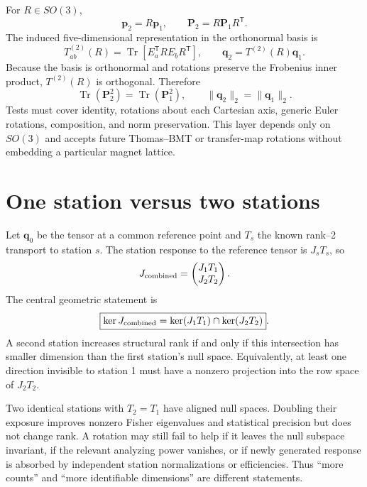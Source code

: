 \documentclass[11pt,a4paper]{article}
\newcommand{\Tens}{\bm P}
\newcommand{\vect}[1]{\bm{#1}}
\newcommand{\Tr}{\operatorname{Tr}}
\begin{document}
For $R\in SO(3)$,
\begin{equation}
 \vect p_2=R\vect p_1,
 \qquad
 \Tens_2=R\Tens_1R^{\mathsf T}.
 \label{eq:rotation}
\end{equation}
The induced five-dimensional representation in the orthonormal basis is
\begin{equation}
 T^{(2)}_{ab}(R)=\Tr\!\left[E_a^{\mathsf T}RE_bR^{\mathsf T}\right],
 \qquad
 \vect q_2=T^{(2)}(R)\vect q_1.
 \label{eq:rank2-map}
\end{equation}
Because the basis is orthonormal and rotations preserve the Frobenius inner
product, $T^{(2)}(R)$ is orthogonal.  Therefore
\begin{equation}
 \Tr(\Tens_2^2)=\Tr(\Tens_1^2),
 \qquad
 \lVert\vect q_2\rVert_2=\lVert\vect q_1\rVert_2.
\end{equation}
Tests must cover identity, rotations about each Cartesian axis, generic Euler
rotations, composition, and norm preservation.  This layer depends only on
$SO(3)$ and accepts future Thomas--BMT or transfer-map rotations without
embedding a particular magnet lattice.

\section{One station versus two stations}

Let $\vect q_0$ be the tensor at a common reference point and $T_s$ the known
rank--2 transport to station $s$.  The station response to the reference tensor
is $J_sT_s$, so
\begin{equation}
 J_{\rm combined}=
 \begin{pmatrix}
 J_1T_1\\J_2T_2
 \end{pmatrix}.
 \label{eq:combined-response}
\end{equation}
The central geometric statement is
\begin{equation}
 \boxed{
 \ker J_{\rm combined}
 =\ker(J_1T_1)\cap\ker(J_2T_2)}.
 \label{eq:kernel-intersection}
\end{equation}
A second station increases structural rank if and only if this intersection has
smaller dimension than the first station's null space.  Equivalently, at least
one direction invisible to station 1 must have a nonzero projection into the
row space of $J_2T_2$.

Two identical stations with $T_2=T_1$ have aligned null spaces.  Doubling their
exposure improves nonzero Fisher eigenvalues and statistical precision but does
not change rank.  A rotation may still fail to help if it leaves the null
subspace invariant, if the relevant analyzing power vanishes, or if newly
generated response is absorbed by independent station normalizations or
efficiencies.  Thus ``more counts'' and ``more identifiable dimensions'' are
different statements.
\end{document}
